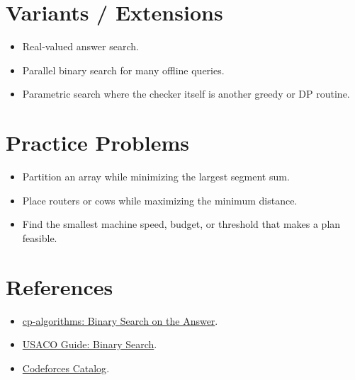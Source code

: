 \section*{Variants / Extensions}

\begin{itemize}
  \item Real-valued answer search.
  \item Parallel binary search for many offline queries.
  \item Parametric search where the checker itself is another greedy or DP routine.
\end{itemize}

\section*{Practice Problems}

\begin{itemize}
  \item Partition an array while minimizing the largest segment sum.
  \item Place routers or cows while maximizing the minimum distance.
  \item Find the smallest machine speed, budget, or threshold that makes a plan feasible.
\end{itemize}

\section*{References}

\begin{itemize}
  \item \href{https://cp-algorithms.com/num_methods/binary_search.html}{cp-algorithms: Binary Search on the Answer}.
  \item \href{https://usaco.guide/silver/binary-search}{USACO Guide: Binary Search}.
  \item \href{https://codeforces.com/catalog}{Codeforces Catalog}.
\end{itemize}
